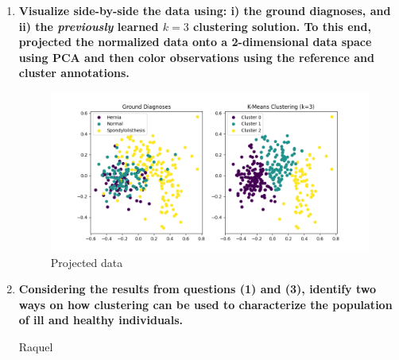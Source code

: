 \documentclass[12pt]{article}
\begin{document}
\begin{enumerate}[leftmargin=\labelsep]
\begin{enumerate}
        \end{enumerate}

  \item \textbf{Visualize side-by-side the data using: i) the ground diagnoses, and ii) the \textit{previously} learned
          $k = 3$ clustering solution. To this end, projected the normalized data onto a 2-dimensional data
          space using PCA and then color observations using the reference and cluster annotations.}

        \vskip 0.3cm
        

        \begin{figure}[H]
          \centering
          \includegraphics[width=17cm]{./assets/ex3-plot.png}
          \caption{Projected data}
          \label{fig:PartII-ex3}
        \end{figure}

  \item \textbf{Considering the results from questions (1) and (3), identify two ways on how clustering can
          be used to characterize the population of ill and healthy individuals.}

        \vskip 0.3cm
        Raquel
\end{enumerate}
\end{document}
